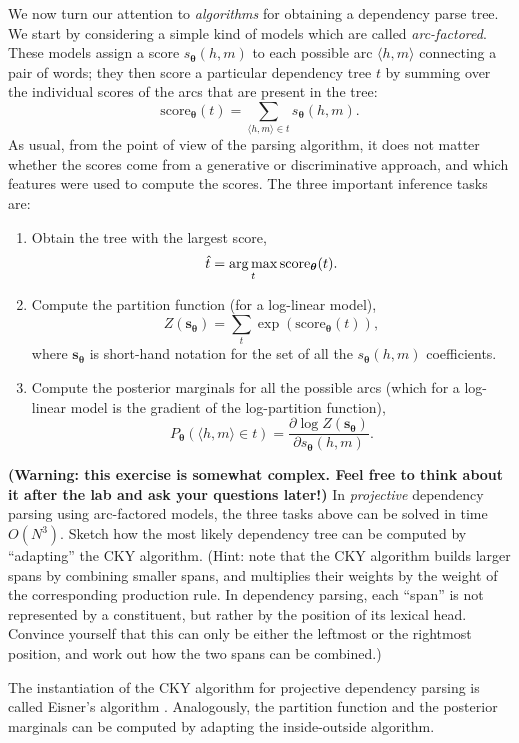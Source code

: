 We now turn our attention to \emph{algorithms} for obtaining a dependency parse tree. 
We start by considering a simple kind of models which are called \emph{arc-factored}.  
These models assign a score $s_{\boldsymbol{\theta}}(h,m)$ to each possible arc $\langle h,m \rangle$ connecting a pair of words; 
they then score a particular dependency tree $t$ by summing over the individual scores of the arcs that are present in the tree: 
$$\mathrm{score}_{\boldsymbol{\theta}}(t) = \sum_{\langle h,m \rangle \in t} s_{\boldsymbol{\theta}}(h,m).$$ 
As usual, from the point of view of the parsing algorithm, 
it does not matter whether the scores come from a generative or discriminative approach, and which features were used to compute the scores. 
The three important inference tasks are: 
\begin{enumerate}
\item Obtain the tree with the largest score, 
$${\hat t} = \operatorname*{arg\,max}_t \mathrm{score}_{\boldsymbol{\theta}}(t).$$
\item Compute the partition function (for a log-linear model),
$$Z(\mathbf{s_{\boldsymbol{\theta}}}) = \sum_t \exp(\mathrm{score}_{\boldsymbol{\theta}}(t)),$$
where $\mathbf{s_{\boldsymbol{\theta}}}$ is short-hand notation for the set of all the $s_{\boldsymbol{\theta}}( h,m )$ coefficients.
\item Compute the posterior marginals for all the possible arcs (which for a log-linear model is the gradient of the log-partition function), 
$$P_{\boldsymbol{\theta}}(\langle h,m \rangle \in t) = \frac{\partial \log Z(\mathbf{s_{\boldsymbol{\theta}}})}{\partial s_{\boldsymbol{\theta}}( h,m )}.$$
\end{enumerate}

\begin{exercise}
\textbf{(Warning: this exercise is somewhat complex. Feel free to think about it after the lab and ask your questions later!)}
In \emph{projective} dependency parsing using arc-factored models, the three tasks above can be solved in time $O(N^3)$. 
Sketch how the most likely dependency tree can be computed by ``adapting'' the CKY algorithm. 
(Hint: note that the CKY algorithm builds larger spans by combining smaller spans, 
and multiplies their weights by the weight of the corresponding production rule. 
In dependency parsing, each ``span'' is not represented by a constituent, 
but rather by the position of its lexical head. 
Convince yourself that this can only be either the leftmost or the rightmost position, 
and work out how the two spans can be combined.)

The instantiation of the CKY algorithm for projective dependency parsing is called Eisner's algorithm \citep{Eisner1996}. 
Analogously,  the partition function and the posterior marginals can be computed by 
adapting the inside-outside algorithm. 
\end{exercise}

